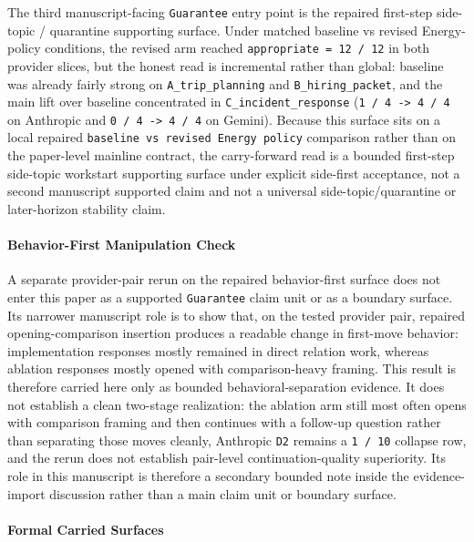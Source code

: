 \documentclass[11pt]{article}
\begin{document}
The third manuscript-facing \texttt{Guarantee} entry point is the repaired
first-step side-topic / quarantine supporting surface. Under matched baseline
vs revised Energy-policy conditions, the revised arm reached
\texttt{appropriate = 12 / 12} in both provider slices, but the honest read is
incremental rather than global: baseline was already fairly strong on
\texttt{A\_trip\_planning} and \texttt{B\_hiring\_packet}, and the main lift
over baseline concentrated in \texttt{C\_incident\_response}
(\texttt{1 / 4 -> 4 / 4} on Anthropic and \texttt{0 / 4 -> 4 / 4} on Gemini).
Because this surface sits on a local repaired
\texttt{baseline vs revised Energy policy} comparison rather than on the
paper-level mainline contract, the carry-forward read is a bounded
first-step side-topic workstart supporting surface under explicit side-first
acceptance, not a second manuscript supported claim and not a universal
side-topic/quarantine or later-horizon stability claim.

\paragraph{Behavior-First Manipulation Check}

A separate provider-pair rerun on the repaired behavior-first surface does not
enter this paper as a supported \texttt{Guarantee} claim unit or as a boundary
surface. Its narrower
manuscript role is to show that, on the tested provider pair, repaired
opening-comparison insertion produces a readable change in first-move behavior:
implementation responses mostly remained in direct relation work, whereas
ablation responses mostly opened with comparison-heavy framing. This result is
therefore carried here only as bounded behavioral-separation evidence. It does
not establish a clean two-stage realization: the ablation arm still most often
opens with comparison framing and then continues with a follow-up question
rather than separating those moves cleanly, Anthropic \texttt{D2} remains a
\texttt{1 / 10} collapse row, and the rerun does not establish pair-level
continuation-quality superiority. Its role in this manuscript is therefore a
secondary bounded note inside the evidence-import discussion rather than a main
claim unit or boundary surface.

\paragraph{Formal Carried Surfaces}
\end{document}
